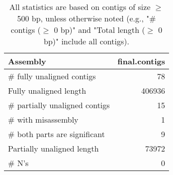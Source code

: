 \documentclass[12pt,a4paper]{article}
\begin{document}
\begin{table}[ht]
\begin{center}
\caption{All statistics are based on contigs of size $\geq$ 500 bp, unless otherwise noted (e.g., "\# contigs ($\geq$ 0 bp)" and "Total length ($\geq$ 0 bp)" include all contigs).}
\begin{tabular}{|l*{1}{|r}|}
\hline
Assembly & final.contigs \\ \hline
\# fully unaligned contigs & 78 \\ \hline
Fully unaligned length & 406936 \\ \hline
\# partially unaligned contigs & 15 \\ \hline
\hspace{5mm}\# with misassembly & 1 \\ \hline
\hspace{5mm}\# both parts are significant & 9 \\ \hline
Partially unaligned length & 73972 \\ \hline
\# N's & 0 \\ \hline
\end{tabular}
\end{center}
\end{table}
\end{document}
